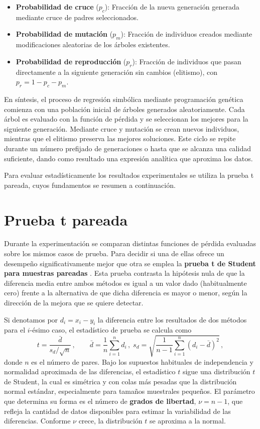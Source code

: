\begin{itemize} \item \textbf{Probabilidad de cruce} (\(p_c\)): Fracción de la nueva generación generada mediante cruce de padres seleccionados.

	\item \textbf{Probabilidad de mutación} (\(p_m\)): Fracción de individuos creados mediante modificaciones aleatorias de los árboles existentes.

	\item \textbf{Probabilidad de reproducción} (\(p_r\)): Fracción de individuos que pasan directamente a la siguiente generación sin cambios (elitismo), con \(p_r = 1 - p_c - p_m\). \end{itemize}

En síntesis, el proceso de regresión simbólica mediante programación genética comienza con una población inicial de árboles generados aleatoriamente. Cada árbol es evaluado con la función de pérdida y se seleccionan los mejores para la siguiente generación. Mediante cruce y mutación se crean nuevos individuos, mientras que el elitismo preserva las mejores soluciones. Este ciclo se repite durante un número prefijado de generaciones o hasta que se alcanza una calidad suficiente, dando como resultado una expresión analítica que aproxima los datos.

Para evaluar estadísticamente los resultados experimentales se utiliza la prueba t pareada, cuyos fundamentos se resumen a continuación.

\section{Prueba t pareada} \label{sec:prueba_t}

Durante la experimentación se comparan distintas funciones de pérdida evaluadas sobre los mismos casos de prueba. Para decidir si una de ellas ofrece un desempeño significativamente mejor que otra se emplea la \textbf{prueba t de Student para muestras pareadas} \cite{montgomery2017applied}. Esta prueba contrasta la hipótesis nula de que la diferencia media entre ambos métodos es igual a un valor dado (habitualmente cero) frente a la alternativa de que dicha diferencia es mayor o menor, según la dirección de la mejora que se quiere detectar.

Si denotamos por \(d_i = x_i - y_i\) la diferencia entre los resultados de dos métodos para el \(i\)-ésimo caso, el estadístico de prueba se calcula como \[ t = \frac{\bar{d}}{s_d / \sqrt{n}}\,, \qquad \bar{d} = \frac{1}{n}\sum_{i=1}^{n} d_i\,,\; s_d = \sqrt{\frac{1}{n-1}\sum_{i=1}^{n} (d_i - \bar{d})^2}\,, \] donde \(n\) es el número de pares. Bajo los supuestos habituales de independencia y normalidad aproximada de las diferencias, el estadístico \(t\) sigue una distribución \(t\) de Student, la cual es simétrica y con colas más pesadas que la distribución normal estándar, especialmente para tamaños muestrales pequeños. El parámetro que determina su forma es el número de \textbf{grados de libertad}, \(\nu = n-1\), que refleja la cantidad de datos disponibles para estimar la variabilidad de las diferencias. Conforme \(\nu\) crece, la distribución \(t\) se aproxima a la normal.


